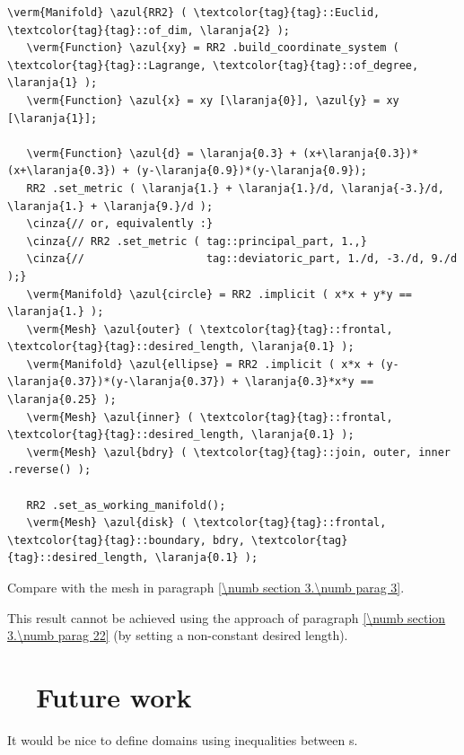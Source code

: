 \begin{Verbatim}[commandchars=\\\{\},formatcom=\small\tt,frame=single,
   label=code not working,rulecolor=\color{moldura},
   baselinestretch=0.94,framesep=2mm                                  ]
   \verm{Manifold} \azul{RR2} ( \textcolor{tag}{tag}::Euclid, \textcolor{tag}{tag}::of_dim, \laranja{2} );
   \verm{Function} \azul{xy} = RR2 .build_coordinate_system ( \textcolor{tag}{tag}::Lagrange, \textcolor{tag}{tag}::of_degree, \laranja{1} );
   \verm{Function} \azul{x} = xy [\laranja{0}], \azul{y} = xy [\laranja{1}];

   \verm{Function} \azul{d} = \laranja{0.3} + (x+\laranja{0.3})*(x+\laranja{0.3}) + (y-\laranja{0.9})*(y-\laranja{0.9});
   RR2 .set_metric ( \laranja{1.} + \laranja{1.}/d, \laranja{-3.}/d, \laranja{1.} + \laranja{9.}/d );
   \cinza{// or, equivalently :}
   \cinza{// RR2 .set_metric ( tag::principal_part, 1.,}
   \cinza{//                   tag::deviatoric_part, 1./d, -3./d, 9./d );}
   \verm{Manifold} \azul{circle} = RR2 .implicit ( x*x + y*y == \laranja{1.} );
   \verm{Mesh} \azul{outer} ( \textcolor{tag}{tag}::frontal, \textcolor{tag}{tag}::desired_length, \laranja{0.1} );
   \verm{Manifold} \azul{ellipse} = RR2 .implicit ( x*x + (y-\laranja{0.37})*(y-\laranja{0.37}) + \laranja{0.3}*x*y == \laranja{0.25} );
   \verm{Mesh} \azul{inner} ( \textcolor{tag}{tag}::frontal, \textcolor{tag}{tag}::desired_length, \laranja{0.1} );
   \verm{Mesh} \azul{bdry} ( \textcolor{tag}{tag}::join, outer, inner .reverse() );

   RR2 .set_as_working_manifold();
   \verm{Mesh} \azul{disk} ( \textcolor{tag}{tag}::frontal, \textcolor{tag}{tag}::boundary, bdry, \textcolor{tag}{tag}::desired_length, \laranja{0.1} );
\end{Verbatim}

Compare with the mesh in paragraph \ref{\numb section 3.\numb parag 3}.

This result cannot be achieved using the approach of paragraph
\ref{\numb section 3.\numb parag 22} (by setting a non-constant desired length).


\section{~~Future work}\label{\numb section 3.\numb parag 25}

It would be nice to define domains using inequalities between {\small\tt{}}s.

